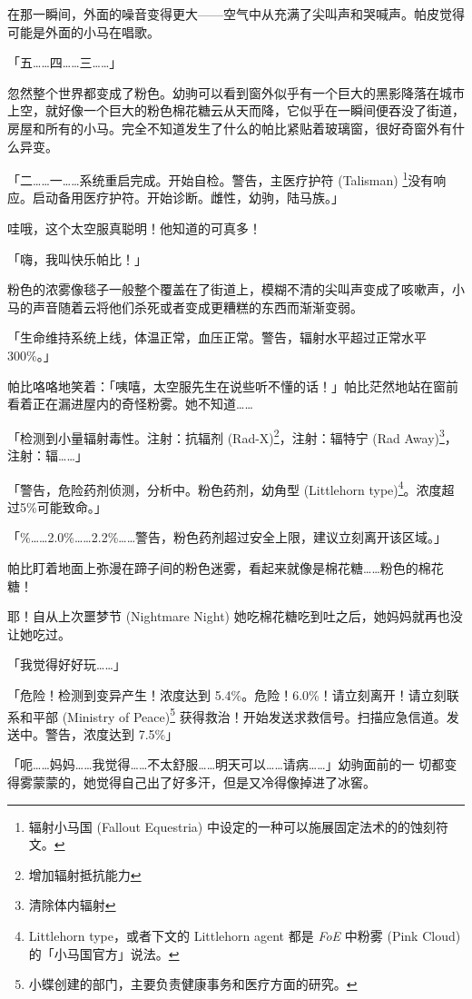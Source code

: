 在那一瞬间，外面的噪音变得更大——空气中从充满了尖叫声和哭喊声。帕皮觉得可能是外面的小马在唱歌。

「{\mt 五……四……三……}」

忽然整个世界都变成了粉色。幼驹可以看到窗外似乎有一个巨大的黑影降落在城市上空，就好像一个巨大的粉色棉花糖云从天而降，它似乎在一瞬间便吞没了街道，房屋和所有的小马。完全不知道发生了什么的帕比紧贴着玻璃窗，很好奇窗外有什么异变。

「{\mt 二……一……系统重启完成。开始自检。警告，主医疗护符 (Talisman) \footnote{辐射小马国 (Fallout Equestria) 中设定的一种可以施展固定法术的的蚀刻符文。}没有响应。启动备用医疗护符。开始诊断。雌性，幼驹，陆马族。}」

哇哦，这个太空服真聪明！他知道的可真多！

「嗨，我叫快乐帕比！」

粉色的浓雾像毯子一般整个覆盖在了街道上，模糊不清的尖叫声变成了咳嗽声，小马的声音随着云将他们杀死或者变成更糟糕的东西而渐渐变弱。

「{\mt 生命维持系统上线，体温正常，血压正常。警告，辐射水平超过正常水平300\%。}」

帕比咯咯地笑着：「咦嘻，太空服先生在说些听不懂的话！」帕比茫然地站在窗前看着正在漏进屋内的奇怪粉雾。她不知道……

「{\mt 检测到小量辐射毒性。注射：抗辐剂 (Rad-X)\footnote{增加辐射抵抗能力}，注射：辐特宁 (Rad Away)\footnote{清除体内辐射}，注射：辐……}」

「{\mt 警告，危险药剂侦测，分析中。粉色药剂，幼角型 (Littlehorn type)\footnote{Littlehorn type，或者下文的 Littlehorn agent 都是 \emph{FoE} 中粉雾 (Pink Cloud) 的「小马国官方」说法。}。浓度超过5\%可能致命。}」

「{\%……2.0\%……2.2\%……警告，粉色药剂超过安全上限，建议立刻离开该区域。}」

帕比盯着地面上弥漫在蹄子间的粉色迷雾，看起来就像是棉花糖……粉色的棉花糖！

耶！自从上次噩梦节 (Nightmare Night) 她吃棉花糖吃到吐之后，她妈妈就再也没让她吃过。

「我觉得好好玩……」

「{\mt 危险！检测到变异产生！浓度达到 5.4\%。危险！6.0\%！请立刻离开！请立刻联系和平部 (Ministry of Peace)\footnote{小蝶创建的部门，主要负责健康事务和医疗方面的研究。} 获得救治！开始发送求救信号。扫描应急信道。发送中。警告，浓度达到 7.5\%}」

「呃……妈妈……我觉得……不太舒服……明天可以……请病……」幼驹面前的一
切都变得雾蒙蒙的，她觉得自己出了好多汗，但是又冷得像掉进了冰窖。


